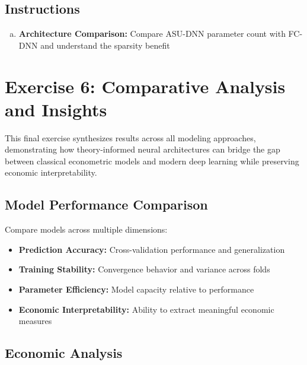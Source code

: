 \documentclass[11pt]{article}
\begin{document}
\subsection*{Instructions}

\begin{enumerate}[(a)]
\item \textbf{Architecture Comparison:} Compare ASU-DNN parameter count with FC-DNN and understand the sparsity benefit
\end{enumerate}

\section*{Exercise 6: Comparative Analysis and Insights}

\begin{center}
\end{center}

This final exercise synthesizes results across all modeling approaches, demonstrating how theory-informed neural architectures can bridge the gap between classical econometric models and modern deep learning while preserving economic interpretability.

\subsection*{Model Performance Comparison}

Compare models across multiple dimensions:
\begin{itemize}
\item \textbf{Prediction Accuracy:} Cross-validation performance and generalization
\item \textbf{Training Stability:} Convergence behavior and variance across folds
\item \textbf{Parameter Efficiency:} Model capacity relative to performance
\item \textbf{Economic Interpretability:} Ability to extract meaningful economic measures
\end{itemize}

\subsection*{Economic Analysis}
\end{document}
